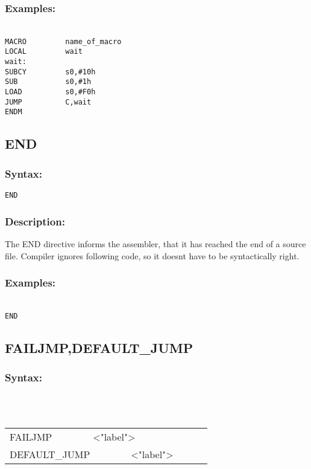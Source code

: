 {        \subsubsection{Examples:}
            {
            ~\\
            \usecodefont
                \verb'MACRO         name_of_macro'\\
                \verb'LOCAL         wait'\\
                \verb'wait:'\\
                \verb'SUBCY         s0,#10h'\\
                \verb'SUB           s0,#1h' \\
                \verb'LOAD          s0,#F0h'\\
                \verb'JUMP          C,wait'\\
                \verb'ENDM'\\
            }
            
    \subsection{END}
        \subsubsection{Syntax:}
            \verb'END'

        \subsubsection{Description:}
        The END directive informs the assembler, that it has reached the end of a source file. Compiler ignores following code, so it doesnt have to be
        syntactically right.

        \subsubsection{Examples:}
            {
                ~\\
                \usecodefont
                \verb'END'
            }

        \subsection{FAILJMP,DEFAULT\_JUMP}
        \subsubsection{Syntax:}\\
        \\ {
                \texttt{}
                \begin{tabular}[h!]{llll}
                        { \color{highlight_directive} FAILJMP }\verb`       `{ \color{highlight_string} <"label"> }\\
                        { \color{highlight_directive} DEFAULT\_JUMP }\verb`       `{ \color{highlight_string} <"label"> }\\
                \end{tabular}
            }\\
            \\
}
